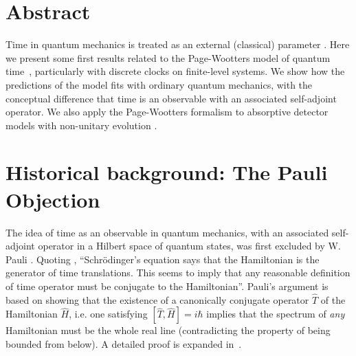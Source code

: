 \documentclass[a0,portrait]{a0poster}
\begin{document}
\begin{multicols}{2} %


\color{Navy} %

\section*{Abstract}
Time in quantum mechanics is treated as an external (classical) parameter \cite{TQM1, TQM2}.
%
Here we present some first results related to
the Page-Wootters model of quantum time~\cite{Lloyd:Time, Maccone:Pauli},
particularly with discrete clocks on finite-level systems.
We show how the predictions of the model fits with
ordinary quantum mechanics, with the conceptual difference that
time is an observable with an associated self-adjoint operator.
We also apply the Page-Wootters formalism
to absorptive detector models with
non-unitary evolution \cite{RuschhauptAbsorption}.


\setlength{\parindent}{2em} %


\color{SaddleBrown} %


\section*{Historical background: The Pauli Objection}
The idea of time as an observable in quantum mechanics,
with an associated self-adjoint operator in a Hilbert space of quantum states,
was first excluded by W. Pauli \cite{PauliFootnote}.
%
Quoting \cite{Maccone:Pauli},
``Schr\"odinger's equation says that the Hamiltonian is the generator of time translations. This seems
to imply that any reasonable definition of time operator must be conjugate to the Hamiltonian''.
%
Pauli's argument
is based on showing that
the existence of
a canonically conjugate operator $\hat{T}$ of the Hamiltonian $\hat{H}$,
i.e. one satisfying
$
  \label{THcommutator}
  [\hat{T}, \hat{H}] = i\hbar
$
implies that the spectrum of \emph{any} Hamiltonian must be the whole real line
(contradicting the property of being bounded from below).
A detailed proof is expanded in~\cite{Galapon2002}.



\end{multicols}
\end{document}
